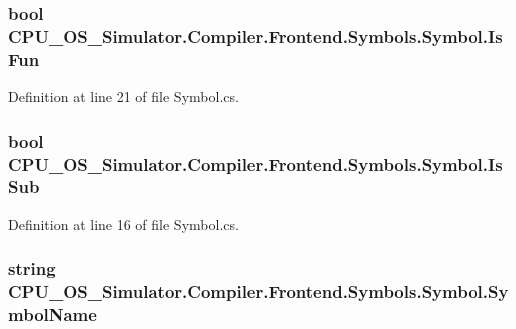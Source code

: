 \subsubsection[{Is\+Fun}]{\setlength{\rightskip}{0pt plus 5cm}bool C\+P\+U\+\_\+\+O\+S\+\_\+\+Simulator.\+Compiler.\+Frontend.\+Symbols.\+Symbol.\+Is\+Fun\hspace{0.3cm}{\ttfamily [get]}}\label{class_c_p_u___o_s___simulator_1_1_compiler_1_1_frontend_1_1_symbols_1_1_symbol_a21f3b82dfe8cb700636c128d9e435161}


Definition at line 21 of file Symbol.\+cs.

\hypertarget{class_c_p_u___o_s___simulator_1_1_compiler_1_1_frontend_1_1_symbols_1_1_symbol_a23ecebb867e96bd9e6c5a07ad7776903}{}
\subsubsection[{Is\+Sub}]{\setlength{\rightskip}{0pt plus 5cm}bool C\+P\+U\+\_\+\+O\+S\+\_\+\+Simulator.\+Compiler.\+Frontend.\+Symbols.\+Symbol.\+Is\+Sub\hspace{0.3cm}{\ttfamily [get]}}\label{class_c_p_u___o_s___simulator_1_1_compiler_1_1_frontend_1_1_symbols_1_1_symbol_a23ecebb867e96bd9e6c5a07ad7776903}


Definition at line 16 of file Symbol.\+cs.

\hypertarget{class_c_p_u___o_s___simulator_1_1_compiler_1_1_frontend_1_1_symbols_1_1_symbol_a869e163bccaf173b44fc04bb0488ead0}{}
\subsubsection[{Symbol\+Name}]{\setlength{\rightskip}{0pt plus 5cm}string C\+P\+U\+\_\+\+O\+S\+\_\+\+Simulator.\+Compiler.\+Frontend.\+Symbols.\+Symbol.\+Symbol\+Name\hspace{0.3cm}{\ttfamily [get]}}\label{class_c_p_u___o_s___simulator_1_1_compiler_1_1_frontend_1_1_symbols_1_1_symbol_a869e163bccaf173b44fc04bb0488ead0}


